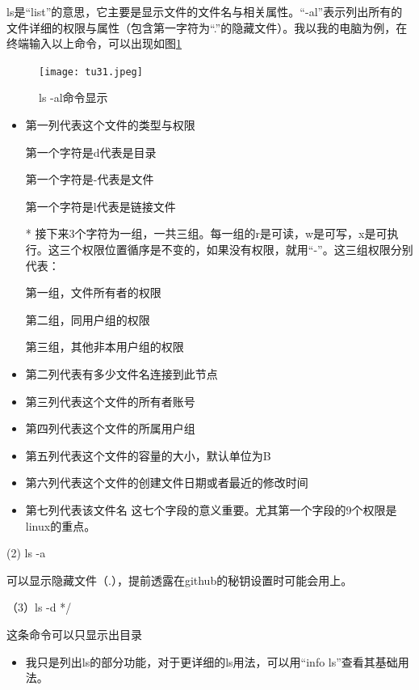 \documentclass{article}
\begin{document}
ls是“list”的意思，它主要是显示文件的文件名与相关属性。“-al”表示列出所有的文件详细的权限与属性（包含第一字符为“.”的隐藏文件）。我以我的电脑为例，在终端输入以上命令，可以出现如图\ref{tu31}
\begin{figure}[!htb] %
\centering
\texttt{[image: tu31.jpeg]}
\caption{\small ls -al命令显示}
\label{tu31}
\end{figure} 
\begin{itemize}

\item 第一列代表这个文件的类型与权限

第一个字符是d代表是目录

第一个字符是-代表是文件

第一个字符是l代表是链接文件
\item[*] 接下来3个字符为一组，一共三组。每一组的r是可读，w是可写，x是可执行。这三个权限位置循序是不变的，如果没有权限，就用“-”。这三组权限分别代表：

第一组，文件所有者的权限

第二组，同用户组的权限

第三组，其他非本用户组的权限

\item  第二列代表有多少文件名连接到此节点

\item  第三列代表这个文件的所有者账号

\item  第四列代表这个文件的所属用户组

\item  第五列代表这个文件的容量的大小，默认单位为B

\item  第六列代表这个文件的创建文件日期或者最近的修改时间

\item  第七列代表该文件名
这七个字段的意义重要。尤其第一个字段的9个权限是linux的重点。

\end{itemize}

(2) ls -a

可以显示隐藏文件（.），提前透露在github的秘钥设置时可能会用上。

（3）ls -d */

这条命令可以只显示出目录
\begin{itemize}
\item 我只是列出ls的部分功能，对于更详细的ls用法，可以用“info ls”查看其基础用法。
\end{itemize}
\end{document}
